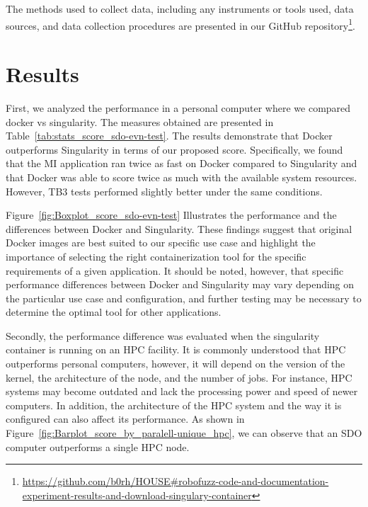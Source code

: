 \documentclass{svproc}
\begin{document}
The methods used to collect data, including any instruments or tools used, data sources, and data collection procedures are presented in our GitHub repository\footnote{\url{https://github.com/b0rh/HOUSE#robofuzz-code-and-documentation-experiment-results-and-download-singulary-container}}.

\section{Results}
\label{sec:results}

First, we analyzed the performance in a personal computer where we compared docker vs singularity. The measures obtained are presented in Table~\ref{tab:stats_score_sdo-evn-test}. The results demonstrate that Docker outperforms Singularity in terms of our proposed score. Specifically, we found that the MI application ran twice as fast on Docker compared to Singularity and that Docker was able to score twice as much with the available system resources. However, TB3 tests performed slightly better under the same conditions. 




Figure~\ref{fig:Boxplot_score_sdo-evn-test} Illustrates the performance and the differences between Docker and Singularity. These findings suggest that original Docker images are best suited to our specific use case and highlight the importance of selecting the right containerization tool for the specific requirements of a given application. It should be noted, however, that specific performance differences between Docker and Singularity may vary depending on the particular use case and configuration, and further testing may be necessary to determine the optimal tool for other applications.




Secondly, the performance difference was evaluated when the singularity container is running on an HPC facility. It is commonly understood that HPC outperforms personal computers, however, it will depend on the version of the kernel, the architecture of the node, and the number of jobs. For instance, HPC systems may become outdated and lack the processing power and speed of newer computers. In addition, the architecture of the HPC system and the way it is configured can also affect its performance. As shown in Figure~\ref{fig:Barplot_score_by_paralell-unique_hpc}, we can observe that an SDO computer outperforms a single HPC node. 
\end{document}
